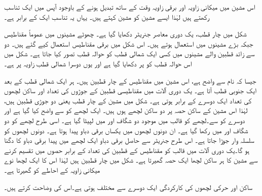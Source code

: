 اس مشین میں  میکانی زاویہ  اور برقی زاویہ   وقت کے ساتھ تبدیل ہونے کے باوجود آپس میں ایک تناسب رکھتے ہیں لہٰذا ایسے مشین کو  مشین  کہتے ہیں۔ یہاں یہ تناسب ایک کے برابر ہے۔ 

شکل   میں چار قطب، یک دوری معاصر جنریٹر دکھایا گیا ہے۔ چھوٹے مشینوں میں عموماً مقناطیس جبکہ بڑے مشینوں میں  استعمال ہوتے ہیں۔ اس شکل میں  برقی مقناطیس استعمال کیے گئے ہیں۔ دو سے زائد قطبین والے مشینوں میں کسی ایک شمالی قطب کو حوالہ قطب تصور کیا جاتا ہے۔ شکل میں اس حوالہ قطب کو  پر دکھایا گیا ہے اور یوں دوسرا شمالی قطب   زاویہ پر ہے۔

 جیسا کہ نام سے واضح ہے، اس مشین میں  مقناطیس کے چار قطبین  ہیں۔ ہر ایک شمالی قطب کے بعد ایک جنوبی قطب آتا ہے۔ یک دوری آلات میں مقناطیسی  قطبین کے جوڑوں کی تعداد اور ساکن لچھوں کی تعداد ایک دوسرے کے برابر ہوتی ہے۔ شکل   میں  مشین کے چار قطب یعنی دو جوڑی قطبین ہیں،  لہٰذا اس مشین کے ساکن حصہ پر دو ساکن لچھے ہوں ہیں۔ ایک لچھے کو  سے واضح کیا گیا ہے اور دوسرے کو  سے۔لچھے  کو  قالب میں موجود دو شگاف  اور  میں لپیٹا گیا ہے۔ اسی طرح  لچھے کو دو شگاف  اور  میں رکھا گیا ہے۔ ان دونوں لچھوں میں یکساں برقی دباو پیدا ہوتا ہے۔  دونوں لچھوں کو سلسلہ وار جوڑا جاتا ہے۔ اس طرح جنریٹر سے حاصل برقی دباو ایک لچھے میں پیدا  برقی دباو کا دگنا ہو گا۔یک دوری آلات میں  قالب کو مقناطیس کے  قطبین کی تعداد کے برابر  حصوں میں تقسیم کرنے سے  مشین کا ہر ساکن لچھا ایک حصہ گھیرتا ہے۔ شکل  میں چار  قطبین  ہیں  لہٰذا اس کا ایک لچھا  نوے میکانی زاویہ کے احاطے کو گھیرتا ہے۔

ساکن اور حرکی لچھوں کی کارکردگی ایک دوسرے سے مختلف ہوتی ہے۔اس کی  وضاحت کرتے ہیں۔

